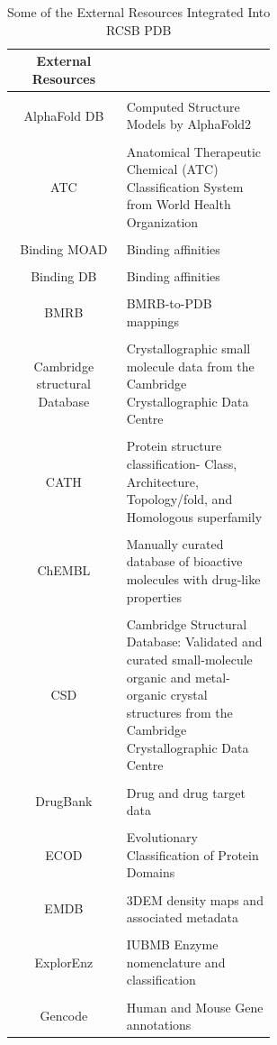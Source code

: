 \documentclass{report}
\begin{document}
\begin{table}[h!]
    \begin{center}
    \label{tab:External Data}
        \begin{tabular}{c|p{0.58\linewidth}}
        External Resources\\
        \hline
        \\
        AlphaFold DB & Computed Structure Models by AlphaFold2
        \\
        \hline
        \\
        ATC & 	Anatomical Therapeutic Chemical (ATC) Classification System from World Health Organization
        \\
        \hline
        \\
        Binding MOAD & Binding affinities
        \\
        \hline
        \\
        Binding DB & Binding affinities
        \\
        \hline
        \\
        BMRB & BMRB-to-PDB mappings
        \\
        \hline
        \\
        Cambridge structural Database & Crystallographic small molecule data from the Cambridge Crystallographic Data Centre
        \\
        \hline
        \\
        CATH & 	Protein structure classification- Class, Architecture, Topology/fold, and Homologous superfamily    
        \\
        \hline
        \\
        ChEMBL & Manually curated database of bioactive molecules with drug-like properties
        \\
        \hline
        \\
        CSD & Cambridge Structural Database: Validated and curated small-molecule organic and metal-organic crystal structures from the Cambridge Crystallographic Data Centre
        \\
        \hline
        \\
        DrugBank & Drug and drug target data
        \\
        \hline
        \\
        ECOD & Evolutionary Classification of Protein Domains
        \\
        \hline
        \\
        EMDB & 3DEM density maps and associated metadata
        \\
        \hline
        \\
        ExplorEnz & IUBMB Enzyme nomenclature and classification
        \\
        \hline
        \\
        Gencode & Human and Mouse Gene annotations
        \end{tabular}
        \caption{\label{External Data}Some of the External Resources Integrated Into RCSB PDB}
    \end{center}
\end{table}
\end{document}

